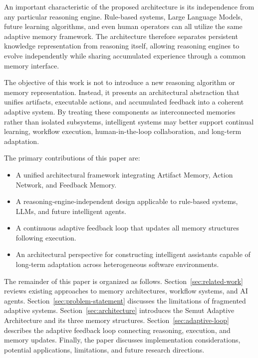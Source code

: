 An important characteristic of the proposed architecture is its independence from any particular reasoning engine. Rule-based systems, Large Language Models, future learning algorithms, and even human operators can all utilize the same adaptive memory framework. The architecture therefore separates persistent knowledge representation from reasoning itself, allowing reasoning engines to evolve independently while sharing accumulated experience through a common memory interface.

The objective of this work is not to introduce a new reasoning algorithm or memory representation. Instead, it presents an architectural abstraction that unifies artifacts, executable actions, and accumulated feedback into a coherent adaptive system. By treating these components as interconnected memories rather than isolated subsystems, intelligent systems may better support continual learning, workflow execution, human-in-the-loop collaboration, and long-term adaptation.

The primary contributions of this paper are:

\begin{itemize}
\item A unified architectural framework integrating Artifact Memory, Action Network, and Feedback Memory.
\item A reasoning-engine-independent design applicable to rule-based systems, LLMs, and future intelligent agents.
\item A continuous adaptive feedback loop that updates all memory structures following execution.
\item An architectural perspective for constructing intelligent assistants capable of long-term adaptation across heterogeneous software environments.
\end{itemize}

The remainder of this paper is organized as follows. Section~\ref{sec:related-work} reviews existing approaches to memory architectures, workflow systems, and AI agents. Section~\ref{sec:problem-statement} discusses the limitations of fragmented adaptive systems. Section~\ref{sec:architecture} introduces the Semut Adaptive Architecture and its three memory structures. Section~\ref{sec:adaptive-loop} describes the adaptive feedback loop connecting reasoning, execution, and memory updates. Finally, the paper discusses implementation considerations, potential applications, limitations, and future research directions.

